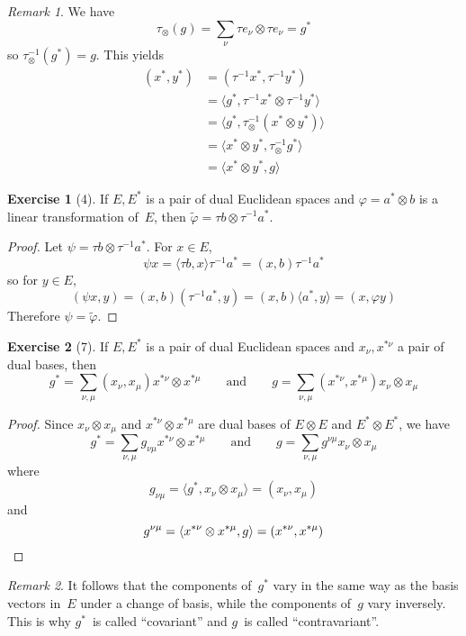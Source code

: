\documentclass[letterpaper,12pt]{article}
\newcommand{\tprod}{\otimes}
\newcommand{\sprod}[2]{\langle#1,#2\rangle}
\newcommand{\iprod}[2]{(#1,#2)}
\newcommand{\adj}[1]{\widetilde{#1}}
\theoremstyle{definition}
\newtheorem*{exer}{Exercise}
\theoremstyle{remark}
\newtheorem*{rmk}{Remark}
\begin{document}
\begin{rmk}
We have
\[\tau_{\tprod}(g)=\sum_{\nu}\tau e_{\nu}\tprod\tau e_{\nu}=g^*\]
so \(\tau_{\tprod}^{-1}(g^*)=g\). This yields
\begin{align*}
\iprod{x^*}{y^*}&=\iprod{\tau^{-1}x^*}{\tau^{-1}y^*}\\
	&=\sprod{g^*}{\tau^{-1}x^*\tprod\tau^{-1}y^*}\\
	&=\sprod{g^*}{\tau_{\tprod}^{-1}(x^*\tprod y^*)}\\
	&=\sprod{x^*\tprod y^*}{\tau_{\tprod}^{-1}g^*}\\
	&=\sprod{x^*\tprod y^*}{g}
\end{align*}
\end{rmk}

\begin{exer}[4]
If \(E,E^*\) is a pair of dual Euclidean spaces and \(\varphi=a^*\tprod b\) is a linear transformation of~\(E\), then \(\adj{\varphi}=\tau b\tprod\tau^{-1}a^*\).
\end{exer}
\begin{proof}
Let \(\psi=\tau b\tprod\tau^{-1}a^*\). For \(x\in E\),
\[\psi x=\sprod{\tau b}{x}\tau^{-1}a^*=\iprod{x}{b}\tau^{-1}a^*\]
so for \(y\in E\),
\[\iprod{\psi x}{y}=\iprod{x}{b}\iprod{\tau^{-1}a^*}{y}=\iprod{x}{b}\sprod{a^*}{y}=\iprod{x}{\varphi y}\]
Therefore \(\psi=\adj{\varphi}\).
\end{proof}

\begin{exer}[7]
If \(E,E^*\) is a pair of dual Euclidean spaces and \(x_{\nu},x^{*\nu}\) a pair of dual bases, then
\[g^*=\sum_{\nu,\mu}\iprod{x_{\nu}}{x_{\mu}}x^{*\nu}\tprod x^{*\mu}\qquad\text{and}\qquad g=\sum_{\nu,\mu}\iprod{x^{*\nu}}{x^{*\mu}}x_{\nu}\tprod x_{\mu}\]
\end{exer}
\begin{proof}
Since \(x_{\nu}\tprod x_{\mu}\) and \(x^{*\nu}\tprod x^{*\mu}\) are dual bases of \(E\tprod E\) and \(E^*\tprod E^*\), we have
\[g^*=\sum_{\nu,\mu}g_{\nu\mu}x^{*\nu}\tprod x^{*\mu}\qquad\text{and}\qquad g=\sum_{\nu,\mu}g^{\nu\mu}x_{\nu}\tprod x_{\mu}\]
where
\[g_{\nu\mu}=\sprod{g^*}{x_{\nu}\tprod x_{\mu}}=\iprod{x_{\nu}}{x_{\mu}}\]
and
\[g^{\nu\mu}=\sprod{x^{*\nu}\tprod x^{*\mu}}{g}=\iprod{x^{*\nu}}{x^{*\mu}}\qedhere\]
\end{proof}
\begin{rmk}
It follows that the components of~\(g^*\) vary in the same way as the basis vectors in~\(E\) under a change of basis, while the components of~\(g\) vary inversely. This is why \(g^*\)~is called ``covariant'' and \(g\)~is called ``contravariant''.
\end{rmk}
\end{document}

